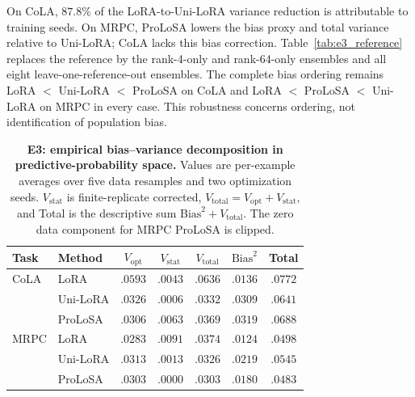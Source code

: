 On CoLA, $87.8\%$ of the LoRA-to-Uni-LoRA variance reduction is attributable to training seeds. On MRPC, ProLoSA lowers the bias proxy and total variance relative to Uni-LoRA; CoLA lacks this bias correction. Table~\ref{tab:e3_reference} replaces the reference by the rank-4-only and rank-64-only ensembles and all eight leave-one-reference-out ensembles. The complete bias ordering remains LoRA $<$ Uni-LoRA $<$ ProLoSA on CoLA and LoRA $<$ ProLoSA $<$ Uni-LoRA on MRPC in every case. This robustness concerns ordering, not identification of population bias.

\begin{table}[t]
\centering
\small
\setlength{\tabcolsep}{5pt}
\caption{\textbf{E3: empirical bias--variance decomposition in predictive-probability space.} Values are per-example averages over five data resamples and two optimization seeds. $V_{\mathrm{stat}}$ is finite-replicate corrected, $V_{\mathrm{total}}=V_{\mathrm{opt}}+V_{\mathrm{stat}}$, and Total is the descriptive sum $\mathrm{Bias}^2+V_{\mathrm{total}}$. The zero data component for MRPC ProLoSA is clipped.}
\label{tab:e3_decomp}
\begin{tabular}{llccccc}
\toprule
Task & Method & $V_{\mathrm{opt}}$ & $V_{\mathrm{stat}}$ & $V_{\mathrm{total}}$ & $\mathrm{Bias}^2$ & Total \\
\midrule
CoLA & LoRA     & $.0593$ & $.0043$ & $.0636$ & $.0136$ & $.0772$ \\
     & Uni-LoRA & $.0326$ & $.0006$ & $.0332$ & $.0309$ & $\mathbf{.0641}$ \\
     & ProLoSA  & $.0306$ & $.0063$ & $.0369$ & $.0319$ & $.0688$ \\
\midrule
MRPC & LoRA     & $.0283$ & $.0091$ & $.0374$ & $.0124$ & $.0498$ \\
     & Uni-LoRA & $.0313$ & $.0013$ & $.0326$ & $.0219$ & $.0545$ \\
     & ProLoSA  & $.0303$ & $.0000$ & $.0303$ & $.0180$ & $\mathbf{.0483}$ \\
\bottomrule
\end{tabular}
\end{table}



